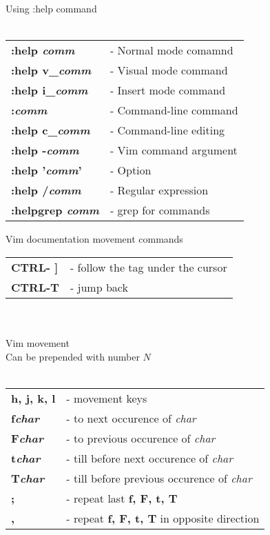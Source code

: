 \documentclass[a4paper,8pt]{extarticle}
\begin{document}
	\begin{multicols*}{4}

		\noindent
		{\LARGE Using :help command}\\\\
		\begin{tabular}{ l l }
			\textbf{:help \textsl{comm}}		&	- Normal mode comamnd  \\
			\textbf{:help v\_\textsl{comm}}	&	- Visual mode command  \\
			\textbf{:help i\_\textsl{comm}}	&	- Insert mode command  \\
			\textbf{:\textsl{comm}}			&	- Command-line command \\
			\textbf{:help c\_\textsl{comm}} 	&	- Command-line editing \\
			\textbf{:help -\textsl{comm}}	 	&	- Vim command argument \\
			\textbf{:help '\textsl{comm}'}	&	- Option			   \\
			\textbf{:help /\textsl{comm}}		&	- Regular expression   \\
			\textbf{:helpgrep \textsl{comm}}	&	- grep for commands	   \\
		\end{tabular}

		\noindent
		Vim documentation movement commands\\
		\begin{tabular}{ l l }
			\textbf{CTRL- ]}	&	- follow the tag under the cursor  \\
			\textbf{CTRL-T}	&	- jump back					\\
		\end{tabular}\\\\

		\noindent
		{\LARGE Vim movement}\\
		Can be prepended with number \(N\)\\\\
		\begin{tabular}{ l l }
			\textbf{h, j, k, l}		&	- movement keys 									\\
			\textbf{f\textsl{char}}	&	- to next occurence of \textsl{char}					\\
			\textbf{F\textsl{char}}	&	- to previous occurence of \textsl{char}				\\
			\textbf{t\textsl{char}}	&	- till before next occurence of \textsl{char}			\\
			\textbf{T\textsl{char}}	&	- till before previous occurence of \textsl{char}			\\
			\textbf{;}			&	- repeat last \textbf{f, F, t, T}						\\
			\textbf{,}			&	- repeat \textbf{f, F, t, T} in opposite direction		\\
		\end{tabular}


\end{multicols*}
\end{document}
